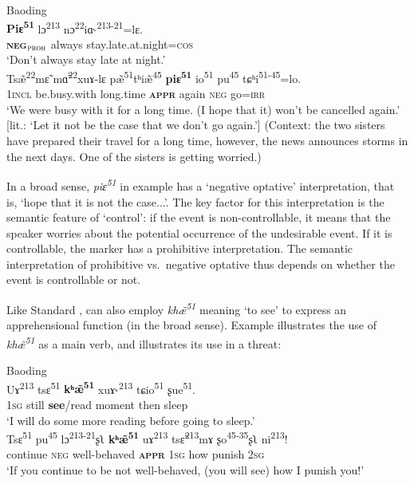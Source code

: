 \documentclass[output=paper,colorlinks,citecolor=brown, language=chinese]{langscibook}
\begin{document}
\ea \label{ex:Song9}  \textnormal{Baoding}\\
\ea \label{ex:Song9a}
\gll \textbf{Piɛ\textsuperscript{51}} lɔ\textsuperscript{213} nɔ\textsuperscript{22}iɑ˞\textsuperscript{213-21}=lɛ. \\
\textbf{\textsc{neg$_{\mathrm{\textsc{proh}}}$}} always stay.late.at.night=\textsc{cos} \\
\glt `Don't always stay late at night.' \\
\ex \label{ex:Song9b}
\gll Tsæ̃\textsuperscript{22}mɛ̃ mɑ̃\textsuperscript{22}xuɤ-lɛ pæ̃\textsuperscript{51}tʰiæ̃\textsuperscript{45} \textbf{piɛ\textsuperscript{51}} io\textsuperscript{51} pu\textsuperscript{45} tɕʰi\textsuperscript{51-45}=lo.  \\
\textsc{1incl} be.busy.with long.time \textsc{\textbf{appr}} again \textsc{neg} go=\textsc{irr} \\
\glt `We were busy with it for a long time. (I hope that it) won't be cancelled again.' [lit.: `Let it not be the case that we don't go again.'] (Context: the two sisters have prepared their travel for a long time, however, the news announces storms in the next days. One of the sisters is getting worried.)
\z
\z

\noindent In a broad sense, \textit{piɛ\textsuperscript{51}} in example  has a `negative optative' interpretation, that is, `hope that it is not the case...'.  The key factor for this interpretation is the semantic feature of `control': if the event is non-controllable, it means that the speaker worries about the potential occurrence of the undesirable event. If it is controllable, the marker has a prohibitive interpretation. The semantic interpretation of prohibitive vs.\ negative optative thus depends on whether the event is controllable or not.

Like Standard ,  can also employ \textit{khæ̃\textsuperscript{51}} meaning `to see' to express an apprehensional function (in the broad sense). Example  illustrates the use of \textit{khæ̃\textsuperscript{51}} as a main verb, and  illustrates its use in a threat:



\ea \label{ex:Song10}  \textnormal{Baoding}\\
\ea \label{ex:Song10a}
\gll Uɤ\textsuperscript{213} tsɛ\textsuperscript{51} \textbf{kʰæ̃\textsuperscript{51}} xuɤ˞\textsuperscript{213} tɕio\textsuperscript{51} ʂue\textsuperscript{51}. \\
\textsc{1sg} still \textbf{see}/read moment then sleep \\
\glt `I will do some more reading before going to sleep.' \\
\ex \label{ex:Song10b}
\gll  Tsɛ\textsuperscript{51} pu\textsuperscript{45} lɔ\textsuperscript{213-21}ʂʅ \textbf{kʰæ̃\textsuperscript{51}} uɤ\textsuperscript{213} tsɛ̃\textsuperscript{213}mɤ	ʂo\textsuperscript{45-35}ʂʅ ni\textsuperscript{213}! \\
continue \textsc{neg} well-behaved \textsc{\textbf{appr}} \textsc{1sg} how punish \textsc{2sg} \\
\glt `If you continue to be not well-behaved, (you will see) how I punish you!'
\z
\z
\end{document}
